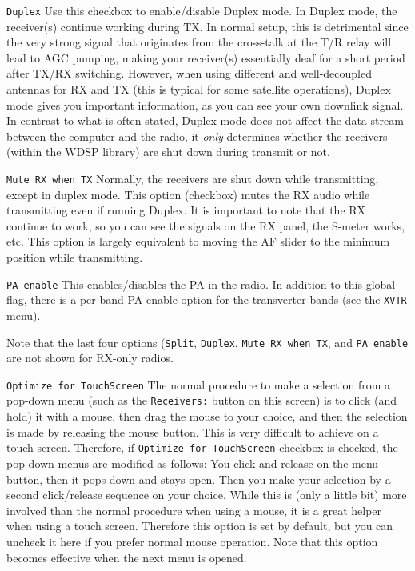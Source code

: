 \documentclass[12pt]{book}
\def\rett#1{\texttt{\color{red}#1}}
\def\bltt#1{\texttt{\color{blue}#1}}
\begin{document}
\rett{Duplex} Use this checkbox to enable/disable Duplex mode. In Duplex mode, the receiver(s)
continue working during TX. In normal setup, this is detrimental since the very strong
signal that originates from the cross-talk at the T/R relay will lead to AGC pumping,
making your receiver(s) essentially deaf for a short period after TX/RX switching.
However, when using different and well-decoupled antennas for RX and TX (this is typical
for some satellite operations), Duplex mode gives you important information, as you can
see your own downlink signal. In contrast to what is often stated, Duplex mode does not
affect the data stream between the computer and the radio, it \textit{only} determines
whether the receivers (within the WDSP library) are shut down during transmit or not.

\rett{Mute RX when TX} Normally, the receivers are shut down while transmitting, except
in duplex mode. This option (checkbox) mutes the RX audio while transmitting even if running
Duplex. It is important
to note that the RX continue to work, so you can see the signals on the RX panel, the
S-meter works, etc. This option is largely equivalent to moving the AF slider to the
minimum position while transmitting.

\rett{PA enable} This enables/disables the PA in the radio. In addition to this global
flag, there is a per-band PA enable option for the transverter bands (see the \bltt{XVTR}
menu).

Note that the last four options (\rett{Split}, \rett{Duplex}, \rett{Mute RX when TX},
and \rett{PA enable} are not shown for RX-only radios.

\rett{Optimize for TouchScreen} The normal procedure to make a selection from a
pop-down menu (such as the \rett{Receivers:} button on this screen) is to click
(and hold) it with a mouse, then drag the mouse to your choice, and then the selection
is made by releasing the mouse button. This is very difficult to achieve on a touch
screen. Therefore, if \rett{Optimize for TouchScreen} checkbox is checked, the pop-down
menus are modified as follows: You click and release on the menu button, then it pops
down and stays open. Then you make your selection by a second click/release sequence
on your choice. While this is (only a little bit) more involved than the normal procedure
when using a mouse, it is a great helper when using a touch screen. Therefore this
option is set by default, but you can uncheck it here if you prefer normal
mouse operation. Note that this option becomes effective when the next menu is opened.
\end{document}
